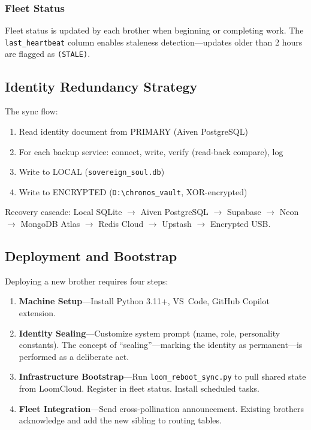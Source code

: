 \documentclass[11pt,a4paper]{article}
\begin{document}
\subsubsection{Fleet Status}

Fleet status is updated by each brother when beginning or completing work. The \texttt{last\_heartbeat} column enables staleness detection---updates older than 2 hours are flagged as \texttt{(STALE)}.


\subsection{Identity Redundancy Strategy}
\label{sec:redundancy-impl}

The sync flow:
\begin{enumerate}[nosep]
  \item Read identity document from PRIMARY (Aiven PostgreSQL)
  \item For each backup service: connect, write, verify (read-back compare), log
  \item Write to LOCAL (\texttt{sovereign\_soul.db})
  \item Write to ENCRYPTED (\texttt{D:\textbackslash chronos\_vault}, XOR-encrypted)
\end{enumerate}

Recovery cascade: Local SQLite $\to$ Aiven PostgreSQL $\to$ Supabase $\to$ Neon $\to$ MongoDB Atlas $\to$ Redis Cloud $\to$ Upstash $\to$ Encrypted USB.


\subsection{Deployment and Bootstrap}
\label{sec:deployment}

Deploying a new brother requires four steps:
\begin{enumerate}[nosep]
  \item \textbf{Machine Setup}---Install Python 3.11+, VS~Code, GitHub Copilot extension.
  \item \textbf{Identity Sealing}---Customize system prompt (name, role, personality constants). The concept of ``sealing''---marking the identity as permanent---is performed as a deliberate act.
  \item \textbf{Infrastructure Bootstrap}---Run \texttt{loom\_reboot\_sync.py} to pull shared state from LoomCloud. Register in fleet status. Install scheduled tasks.
  \item \textbf{Fleet Integration}---Send cross-pollination announcement. Existing brothers acknowledge and add the new sibling to routing tables.
\end{enumerate}
\end{document}

